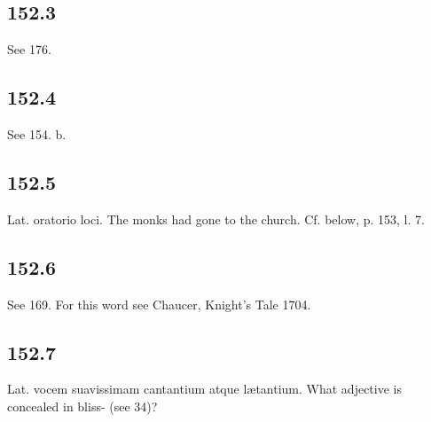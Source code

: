 \subsection*{152.3}

See 176.

\subsection*{152.4}

See 154. b.

\subsection*{152.5}

Lat. oratorio loci. The monks had gone to the church. Cf. below, p. 153, l. 7.

\subsection*{152.6}

See 169. For this word see Chaucer, Knight’s Tale 1704.

\subsection*{152.7}

Lat. vocem suavissimam cantantium atque lætantium. What adjective is concealed in bliss- (see 34)?

